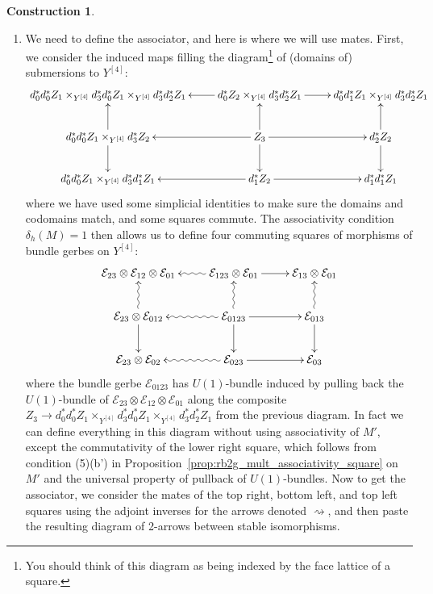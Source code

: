 \documentclass[12pt]{amsart}
\theoremstyle{plain}
\theoremstyle{definition}
\newtheorem{construction}[theorem]{Construction}
\theoremstyle{remark}
\numberwithin{equation}{section}
\newcommand{\cE}{{\mathcal E}}
\newcommand{\<}{\langle}
\renewcommand{\>}{\rangle}
\begin{document}
\begin{construction}
\begin{enumerate}
\item We need to define the associator, and here is where we will use mates. 
First, we consider the induced maps filling the diagram\footnote{You should think of this diagram as being indexed by the face lattice of a square.} of (domains of) submersions to $Y^{[4]}$:
\[
	\xymatrix{
		d_0^*d_0^*Z_1 \times_{Y^{[4]}} d_3^*d_0^*Z_1\times_{Y^{[4]}} d_3^*d_2^*Z_1 & \ar[l]d_0^*Z_2\times_{Y^{[4]}} d_3^*d_2^*Z_1 \ar[r]& d_0^*d_1^* Z_1\times_{Y^{[4]}}d_3^*d_2^*Z_1 \\
		\ar[u] d_0^* d_0^* Z_1 \times_{Y^{[4]}} d_3^*Z_2 \ar[d] & \ar[l] \ar[u] Z_3 \ar[r] \ar[d] & \ar[u] d_2^*Z_2 \ar[d] \\
		d_0^* d_0^* Z_1 \times_{Y^{[4]}} d_3^*d_1^*Z_1& \ar[l] d_1^*Z_2 \ar[r] & d_1^*d_1^* Z_1
		}
\]
where we have used some simplicial identities to make sure the domains and codomains match, and some squares commute.
The associativity condition $\delta_h(M)=1$ then allows us to define four commuting squares of morphisms of bundle gerbes on $Y^{[4]}$:
\begin{equation}\label{eq:pre_associator}
	\begin{gathered}
		\xymatrix{
				\cE_{23}\otimes \cE_{12}\otimes \cE_{01} & \ar@{~>}[l] \cE_{123}\otimes \cE_{01} \ar[r] & \cE_{13}\otimes \cE_{01}\\
				\ar@{~>}[u] \cE_{23}\otimes \cE_{012} \ar[d] & \ar@{~>}[l] \ar@{~>}[u]  \cE_{0123} \ar[r] \ar[d]& \ar@{~>}[u] \cE_{013}\ar[d] \\
				\cE_{23}\otimes \cE_{02} & \ar@{~>}[l] \cE_{023} \ar[r] & \cE_{03}
		}
		\end{gathered}
\end{equation}
where the bundle gerbe $\cE_{0123}$ has $U(1)$-bundle induced by pulling back the $U(1)$-bundle of $\cE_{23}\otimes \cE_{12}\otimes \cE_{01} $ along the composite $Z_3 \to d_0^*d_0^*Z_1 \times_{Y^{[4]}} d_3^*d_0^*Z_1\times_{Y^{[4]}} d_3^*d_2^*Z_1$ from the previous diagram.
In fact we can define everything in this diagram without using associativity of $M'$, except the commutativity of the lower right square, which follows from condition (5)(b') in Proposition~\ref{prop:rb2g_mult_associativity_square} on $M'$ and the universal property of pullback of $U(1)$-bundles.
Now to get the associator, we consider the mates of the top right, bottom left, and top left squares using the adjoint inverses for the arrows denoted $\rightsquigarrow$, and then paste the resulting diagram of 2-arrows between stable isomorphisms.



\end{enumerate}
\end{construction}
\end{document}
